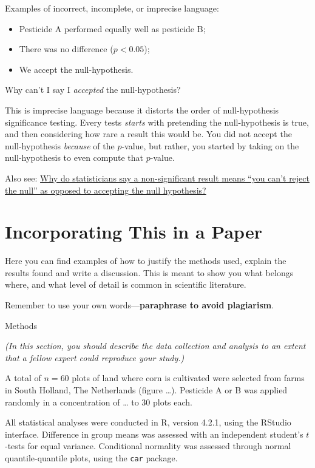 \documentclass[
]{book}
\providecommand{\tightlist}{%
  \setlength{\itemsep}{0pt}\setlength{\parskip}{0pt}}
\begin{document}
Examples of incorrect, incomplete, or imprecise language:

\begin{itemize}
\tightlist
\item
  Pesticide A performed equally well as pesticide B;
\item
  There was no difference (\(p < 0.05\));
\item
  We accept the null-hypothesis.
\end{itemize}

Why can't I say I \emph{accepted} the null-hypothesis?

This is imprecise language because it distorts the order of null-hypothesis significance testing. Every tests \emph{starts} with pretending the null-hypothesis is true, and then considering how rare a result this would be. You did not accept the null-hypothesis \emph{because} of the \(p\)-value, but rather, you started by taking on the null-hypothesis to even compute that \(p\)-value.

Also see: \href{https://stats.stackexchange.com/a/85914/176202}{Why do statisticians say a non-significant result means ``you can't reject the null'' as opposed to accepting the null hypothesis?}

\hypertarget{incorporating-this-in-a-paper}{%
\section{Incorporating This in a Paper}\label{incorporating-this-in-a-paper}}

Here you can find examples of how to justify the methods used, explain the results found and write a discussion. This is meant to show you what belongs where, and what level of detail is common in scientific literature.

Remember to use your own words---\textbf{paraphrase to avoid plagiarism}.

Methods

\emph{(In this section, you should describe the data collection and analysis to an extent that a fellow expert could reproduce your study.)}

A total of \(n = 60\) plots of land where corn is cultivated were selected from farms in South Holland, The Netherlands (figure \ldots). Pesticide A or B was applied randomly in a concentration of \ldots{} to 30 plots each.

All statistical analyses were conducted in R, version 4.2.1, using the RStudio interface.\citep{R, RStudio} Difference in group means was assessed with an independent student's \(t\)-tests for equal variance. Conditional normality was assessed through normal quantile-quantile plots, using the \texttt{car} package.\citep{car}
\end{document}
